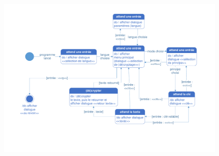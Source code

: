 \documentclass[a4paper,12pt,abstracton,titlepage]{scrartcl}
\begin{document}
\begin{figure}[tpbh]
	\centering
  \includegraphics[width=\textwidth, trim=20mm 25mm 25mm 13mm, clip]{./Diagrammes/diagrammeDesEtats.pdf}
	\label{img:etats}
\end{figure}


\newpage
\end{document}
